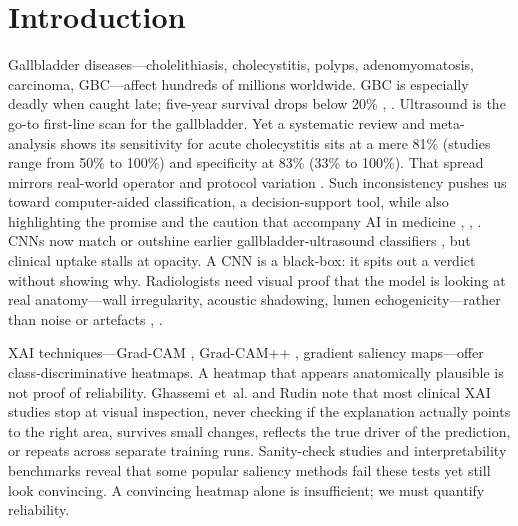 \section{Introduction}

Gallbladder diseases---cholelithiasis, cholecystitis, polyps, adenomyomatosis, carcinoma, GBC---affect hundreds of millions worldwide. GBC is especially deadly when caught late; five-year survival drops below 20\% \cite{ref1}, \cite{ref2}. Ultrasound is the go-to first-line scan for the gallbladder. Yet a systematic review and meta-analysis shows its sensitivity for acute cholecystitis sits at a mere 81\% (studies range from 50\% to 100\%) and specificity at 83\% (33\% to 100\%). That spread mirrors real-world operator and protocol variation \cite{ref3}. Such inconsistency pushes us toward computer-aided classification, a decision-support tool, while also highlighting the promise and the caution that accompany AI in medicine \cite{ref4}, \cite{ref5}, \cite{ref6}. CNNs now match or outshine earlier gallbladder-ultrasound classifiers \cite{ref7}, but clinical uptake stalls at opacity. A CNN is a black-box: it spits out a verdict without showing why. Radiologists need visual proof that the model is looking at real anatomy---wall irregularity, acoustic shadowing, lumen echogenicity---rather than noise or artefacts \cite{ref9}, \cite{ref10}.

XAI techniques---Grad-CAM \cite{ref11}, Grad-CAM++ \cite{ref12}, gradient saliency maps---offer class-discriminative heatmaps. A heatmap that appears anatomically plausible is not proof of reliability. Ghassemi et~al. \cite{ref9} and Rudin \cite{ref8} note that most clinical XAI studies stop at visual inspection, never checking if the explanation actually points to the right area, survives small changes, reflects the true driver of the prediction, or repeats across separate training runs. Sanity-check studies \cite{ref13} and interpretability benchmarks \cite{ref14} reveal that some popular saliency methods fail these tests yet still look convincing. A convincing heatmap alone is insufficient; we must quantify reliability.

